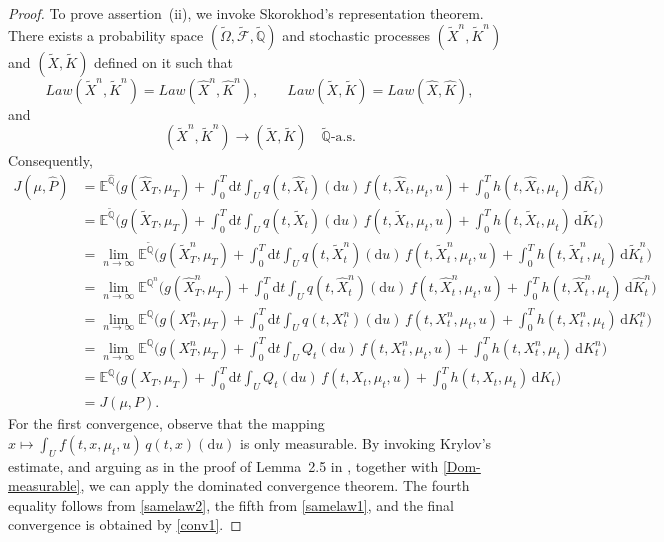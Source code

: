 \documentclass[11pt,amsfonts]{article}
\theoremstyle{plain}
\theoremstyle{assumpstyle}
\numberwithin{equation}{section}
\numberwithin{theorem}{section}
\numberwithin{proposition}{section}
\numberwithin{definition}{section}
\numberwithin{remark}{section}
\numberwithin{corollary}{section}
\numberwithin{lemma}{section}
\begin{document}
\begin{proof}
To prove assertion~(ii), we invoke Skorokhod’s representation theorem. There exists a probability space
$(\tilde{\Omega},\tilde{\mathcal{F}},\tilde{\mathbb{Q}})$ and stochastic processes
$(\tilde{X}^n,\tilde{K}^n)$ and $(\tilde{X},\tilde{K})$ defined on it such that
\begin{equation}\label{samelaw2}
Law(\tilde{X}^n,\tilde{K}^n)=Law(\hat{X}^n,\hat{K}^n),
\qquad
Law(\tilde{X},\tilde{K})=Law(\hat{X},\hat{K}),
\end{equation}
and
\begin{equation}\label{conv2}
(\tilde{X}^n,\tilde{K}^n)\longrightarrow (\tilde{X},\tilde{K})
\quad \tilde{\mathbb{Q}}\text{-a.s.}
\end{equation}
Consequently,
\begin{align*}
J(\mu,\hat{P})
&= \mathbb{E}^{\hat{\mathbb{Q}}}\Bigg(
g(\hat{X}_T,\mu_T)
+ \int_0^T \mathrm{d}t \int_U q(t,\hat{X}_t)(\mathrm{d}u)\,
f(t,\hat{X}_t,\mu_t,u)
+ \int_0^T h(t,\hat{X}_t,\mu_t)\,\mathrm{d}\hat{K}_t
\Bigg)\\
&=\mathbb{E}^{\tilde{\mathbb{Q}}}\Bigg(
g(\tilde{X}_T,\mu_T)
+ \int_0^T \mathrm{d}t \int_U q(t,\tilde{X}_t)(\mathrm{d}u)\,
f(t,\tilde{X}_t,\mu_t,u)
+ \int_0^T h(t,\tilde{X}_t,\mu_t)\,\mathrm{d}\tilde{K}_t
\Bigg)  \\
&= \lim_{n\to\infty}
\mathbb{E}^{\tilde{\mathbb{Q}}}\Bigg(
g(\tilde{X}^n_T,\mu_T)
+ \int_0^T \mathrm{d}t \int_U q(t,\tilde{X}^n_t)(\mathrm{d}u)\,
f(t,\tilde{X}^n_t,\mu_t,u)
+ \int_0^T h(t,\tilde{X}^n_t,\mu_t)\,\mathrm{d}\tilde{K}^n_t
\Bigg) \\
&= \lim_{n\to\infty}
\mathbb{E}^{\mathbb{Q}^n}\Bigg(
g(\hat{X}^n_T,\mu_T)
+ \int_0^T \mathrm{d}t \int_U q(t,\hat{X}^n_t)(\mathrm{d}u)\,
f(t,\hat{X}^n_t,\mu_t,u)
+ \int_0^T h(t,\hat{X}^n_t,\mu_t)\,\mathrm{d}\hat{K}^n_t
\Bigg) \\
&= \lim_{n\to\infty}
\mathbb{E}^{\mathbb{Q}}\Bigg(
g(X^n_T,\mu_T)
+ \int_0^T \mathrm{d}t \int_U q(t,X^n_t)(\mathrm{d}u)\,
f(t,X^n_t,\mu_t,u)
+ \int_0^T h(t,X^n_t,\mu_t)\,\mathrm{d}K^n_t
\Bigg) \\
&= \lim_{n\to\infty}
\mathbb{E}^{\mathbb{Q}}\Bigg(
g(X^n_T,\mu_T)
+ \int_0^T \mathrm{d}t \int_U Q_t(\mathrm{d}u)\,
f(t,X^n_t,\mu_t,u)
+ \int_0^T h(t,X^n_t,\mu_t)\,\mathrm{d}K^n_t
\Bigg) \\
&= \mathbb{E}^{\mathbb{Q}}\Bigg(
g(X_T,\mu_T)
+ \int_0^T \mathrm{d}t \int_U Q_t(\mathrm{d}u)\,
f(t,X_t,\mu_t,u)
+ \int_0^T h(t,X_t,\mu_t)\,\mathrm{d}K_t
\Bigg) \\
&= J(\mu,P).
\end{align*}
For the first convergence, observe that the mapping $x \longmapsto \int_U f(t,x,\mu_t,u)\,q(t,x)(\mathrm{d}u)$ is only measurable. 
By invoking Krylov’s estimate, and arguing as in the proof of Lemma~2.5 in \cite{Slominski-convergence}, 
together with \eqref{Dom-measurable}, we can apply the dominated convergence theorem. 
The fourth equality follows from \eqref{samelaw2}, the fifth from \eqref{samelaw1}, 
and the final convergence is obtained by \eqref{conv1}.
\end{proof}
\end{document}

